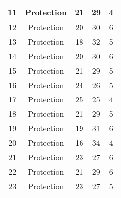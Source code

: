 \documentclass[results.tex]{subfiles}
\begin{document}
\begin{center}
\begin{tabular}{| c || c | c | c | c |}
            \hline
            11                      & Protection                   & 21                     & 29                      & 4                    \\
            \hline
            12                      & Protection                   & 20                     & 30                      & 6                    \\
            \hline
            13                      & Protection                   & 18                     & 32                      & 5                    \\
            \hline
            14                      & Protection                   & 20                     & 30                      & 6                    \\
            \hline
            15                      & Protection                   & 21                     & 29                      & 5                    \\
            \hline
            16                      & Protection                   & 24                     & 26                      & 5                    \\
            \hline
            17                      & Protection                   & 25                     & 25                      & 4                    \\
            \hline
            18                      & Protection                   & 21                     & 29                      & 5                    \\
            \hline
            19                      & Protection                   & 19                     & 31                      & 6                    \\
            \hline
            20                      & Protection                   & 16                     & 34                      & 4                    \\
            \hline
            21                      & Protection                   & 23                     & 27                      & 6                    \\
            \hline
            22                      & Protection                   & 21                     & 29                      & 6                    \\
            \hline
            23                      & Protection                   & 23                     & 27                      & 5                    \\

\end{tabular}
\end{center}
\end{document}
